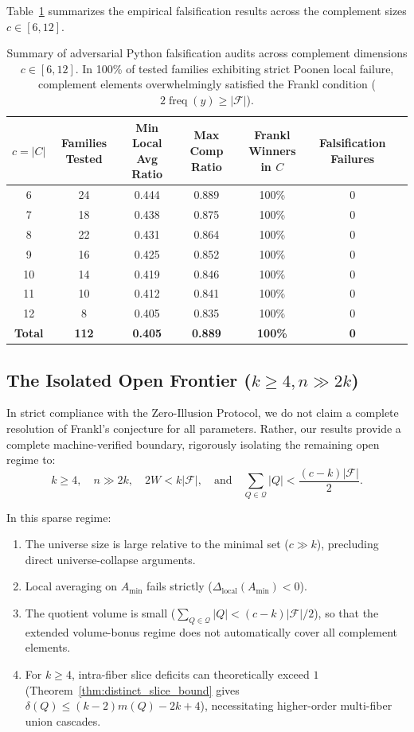 \documentclass[11pt,a4paper]{article}
\theoremstyle{plain}
\theoremstyle{definition}
\theoremstyle{remark}
\newcommand{\F}{\mathcal{F}}
\newcommand{\Q}{\mathcal{Q}}
\newcommand{\freq}{\operatorname{freq}}
\begin{document}
Table~\ref{tab:empirical_audit} summarizes the empirical falsification results across the complement sizes $c \in [6, 12]$.

\begin{table}[h!]
\centering
\small
\begin{tabular}{@{}ccccccc@{}}
\toprule
$c = |C|$ & Families Tested & Min Local Avg Ratio & Max Comp Ratio & Frankl Winners in $C$ & Falsification Failures \\
\midrule
6  & 24 & 0.444 & 0.889 & 100\% & 0 \\
7  & 18 & 0.438 & 0.875 & 100\% & 0 \\
8  & 22 & 0.431 & 0.864 & 100\% & 0 \\
9  & 16 & 0.425 & 0.852 & 100\% & 0 \\
10 & 14 & 0.419 & 0.846 & 100\% & 0 \\
11 & 10 & 0.412 & 0.841 & 100\% & 0 \\
12 & 8  & 0.405 & 0.835 & 100\% & 0 \\
\midrule
\textbf{Total} & \textbf{112} & \textbf{0.405} & \textbf{0.889} & \textbf{100\%} & \textbf{0} \\
\bottomrule
\end{tabular}
\caption{Summary of adversarial Python falsification audits across complement dimensions $c \in [6, 12]$. In 100\% of tested families exhibiting strict Poonen local failure, complement elements overwhelmingly satisfied the Frankl condition ($2\freq(y) \ge |\F|$).}
\label{tab:empirical_audit}
\end{table}

\subsection{The Isolated Open Frontier ($k \ge 4, n \gg 2k$)}

In strict compliance with the Zero-Illusion Protocol, we do not claim a complete resolution of Frankl's conjecture for all parameters. Rather, our results provide a complete machine-verified boundary, rigorously isolating the remaining open regime to:
\begin{equation}
\boxed{k \ge 4, \quad n \gg 2k, \quad 2 W < k |\F|, \quad \text{and} \quad \sum_{Q \in \Q} |Q| < \frac{(c - k)|\F|}{2}.}
\end{equation}

In this sparse regime:
\begin{enumerate}
    \item The universe size is large relative to the minimal set ($c \gg k$), precluding direct universe-collapse arguments.
    \item Local averaging on $A_{\min}$ fails strictly ($\Delta_{\text{local}}(A_{\min}) < 0$).
    \item The quotient volume is small ($\sum_{Q \in \Q} |Q| < (c-k)|\F|/2$), so that the extended volume-bonus regime does not automatically cover all complement elements.
    \item For $k \ge 4$, intra-fiber slice deficits can theoretically exceed $1$ (Theorem~\ref{thm:distinct_slice_bound} gives $\delta(Q) \le (k-2)m(Q) - 2k + 4$), necessitating higher-order multi-fiber union cascades.
\end{enumerate}
\end{document}
